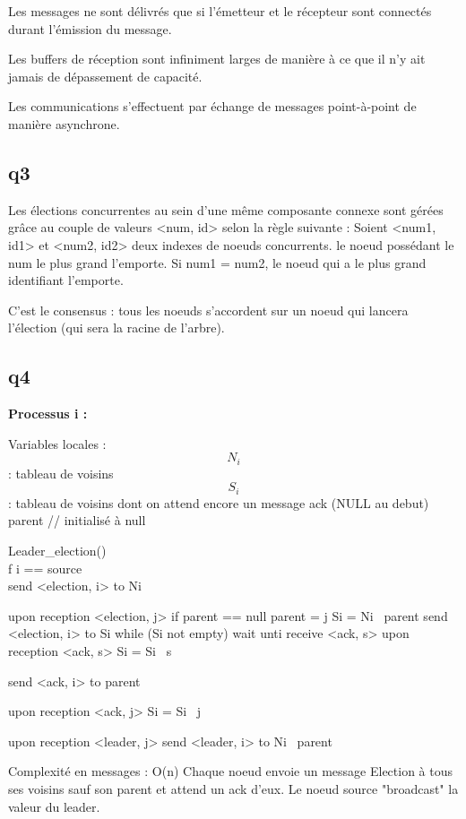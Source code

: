 \documentclass[paper=a4, fontsize=11pt]{report} %
\begin{document}
Les messages ne sont délivrés que si l'émetteur et le récepteur sont connectés durant l'émission du message.

Les buffers de réception sont infiniment larges de manière à ce que il n'y ait jamais de dépassement de capacité.

Les communications s'effectuent par échange de messages point-à-point de manière asynchrone.

\subsection{q3}

Les élections concurrentes au sein d'une même composante connexe sont gérées grâce au couple de valeurs <num, id> selon la règle suivante :
Soient <num1, id1> et <num2, id2> deux indexes de noeuds concurrents. le noeud possédant le num le plus grand l'emporte.
Si num1 = num2, le noeud qui a le plus grand identifiant l'emporte.

C'est le consensus : tous les noeuds s'accordent sur un noeud qui lancera l'élection (qui sera la racine de l'arbre).


\subsection{q4}

\textbf{Processus i :}

Variables locales :
\[N_{i}\] : tableau de voisins
\[S_{i}\] : tableau de voisins dont on attend encore un message ack (NULL au debut)
parent // initialisé à null

Leader\_election() {\\
\vspace{1cm}f i == source\\
\vspace{2cm}send <election, i> to Ni	
}

upon reception <election, j>
	if parent == null
		parent = j
		Si = Ni \ parent
		send <election, i> to Si
		while (Si not empty)
			wait unti receive <ack, s>
			upon reception <ack, s>
			Si = Si \ s

	send <ack, i> to parent
			

upon reception <ack, j>
	Si = Si \ j

upon reception <leader, j>
	send <leader, i> to Ni \ parent


Complexité en messages : O(n)
Chaque noeud envoie un message Election à tous ses voisins sauf son parent et attend un ack d'eux.
Le noeud source "broadcast" la valeur du leader.
\end{document}
